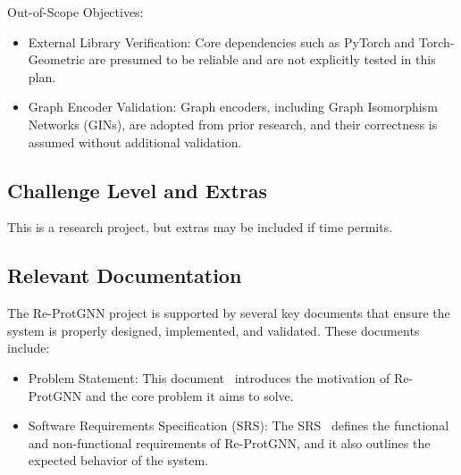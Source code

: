 \documentclass[12pt, titlepage]{article}
\begin{document}

Out-of-Scope Objectives:
\begin{itemize}
    \item External Library Verification: Core dependencies such as PyTorch and Torch-Geometric are presumed to be reliable and are not explicitly tested in this plan.
    \item Graph Encoder Validation: Graph encoders, including Graph Isomorphism Networks (GINs), are adopted from prior research, and their correctness is assumed without additional validation.
\end{itemize}

\subsection{Challenge Level and Extras}
This is a research project, but extras may be included if time permits.

\subsection{Relevant Documentation}

The Re-ProtGNN project is supported by several key documents that ensure the system is properly designed, implemented, and validated. These documents include:

\begin{itemize}
    \item Problem Statement: This document~\citep{yuanqi2025protgnn} introduces the motivation of Re-ProtGNN and the core problem it aims to solve.
    
    \item Software Requirements Specification (SRS): The SRS~\citep{Yuanqi_ReProtGNN_SRS} defines the functional and non-functional requirements of Re-ProtGNN, and it also outlines the expected behavior of the system.
\end{itemize}
\end{document}
